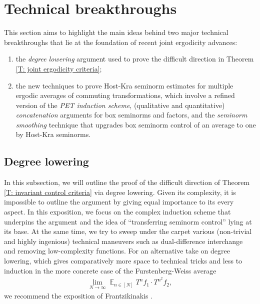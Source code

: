 \documentclass[11pt]{amsart}
\theoremstyle{definition}
\DeclareMathOperator*{\E}{\mathbb{E}}
\newcommand{\1}{{\mathbf{1}}}
\begin{document}
\section{Technical breakthroughs}\label{S: technical breakthroughs}
This section aims to highlight the main ideas behind two major technical breakthroughs that lie at the foundation of recent joint ergodicity advances:
\begin{enumerate}
    \item the \emph{degree lowering} argument used to prove the difficult direction in Theorem \ref{T: joint ergodicity criteria};
    \item the new techniques to prove {Host-Kra seminorm estimates} for multiple ergodic averages of commuting transformations, which involve a refined version of the \emph{PET induction scheme}, (qualitative and quantitative) \emph{concatenation} arguments for box seminorms and factors, and the \emph{seminorm smoothing} technique that upgrades box seminorm control of an average to one by Host-Kra seminorms.
\end{enumerate}


\subsection{Degree lowering}\label{S: degree lowering proof}

In this subsection, we will outline the proof of the difficult direction of Theorem \ref{T: invariant control criteria} via degree lowering. %
Given its complexity, it is impossible to outline the argument by giving equal importance to its every aspect. In this exposition, we focus on the complex induction scheme that underpins the argument and the idea of ``transferring seminorm control'' lying at its base. At the same time, we try to sweep under the carpet various (non-trivial and highly ingenious) technical maneuvers such as dual-difference interchange and removing low-complexity functions. 
For an alternative take on degree lowering, which gives comparatively more space to technical tricks and less to induction in the more concrete case of the Furstenberg-Weiss average
\begin{align*}
    \lim_{N\to\infty}\E_{n\in[N]}T^n f_1 \cdot T^{n^2}f_2,
\end{align*}
we recommend the exposition of Frantzikinakis \cite[Section 2]{Fr21}.
\end{document}
